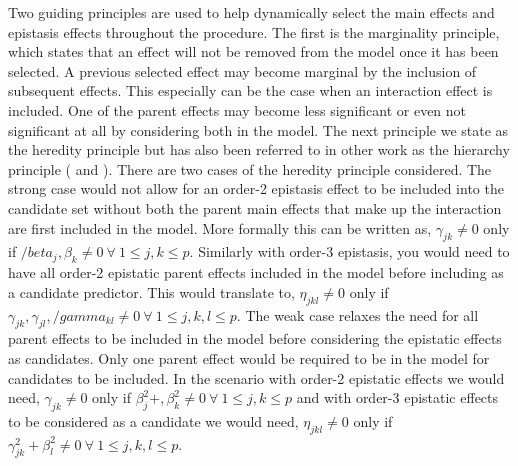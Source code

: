\documentclass[11pt,]{book}
\theoremstyle{definition}
\theoremstyle{definition}
\theoremstyle{remark}
\begin{document}
Two guiding principles are used to help dynamically select the main
effects and epistasis effects throughout the procedure. The first is the
marginality principle, which states that an effect will not be removed
from the model once it has been selected. A previous selected effect may
become marginal by the inclusion of subsequent effects. This especially
can be the case when an interaction effect is included. One of the
parent effects may become less significant or even not significant at
all by considering both in the model. The next principle we state as the
heredity principle but has also been referred to in other work as the
hierarchy principle (\cite{bien2013lasso} and \cite{lim2015learning}).
There are two cases of the heredity principle considered. The strong
case would not allow for an order-2 epistasis effect to be included into
the candidate set without both the parent main effects that make up the
interaction are first included in the model. More formally this can be
written as, \(\gamma_{jk} \ne 0\) only if
\(/beta_j ,\beta_k \ne 0 ~\forall~ 1 \le j, k \le p\). Similarly with
order-3 epistasis, you would need to have all order-2 epistatic parent
effects included in the model before including as a candidate predictor.
This would translate to, \(\eta_{jkl} \ne 0\) only if
\(\gamma_{jk},\gamma_{jl},/gamma_{kl} \ne 0~\forall~ 1 \le j,k,l \le p\).
The weak case relaxes the need for all parent effects to be included in
the model before considering the epistatic effects as candidates. Only
one parent effect would be required to be in the model for candidates to
be included. In the scenario with order-2 epistatic effects we would
need, \(\gamma_{jk} \ne 0\) only if
\(\beta_j^2+,\beta_k^2 \ne 0~ \forall~ 1 \le j, k \le p\) and with
order-3 epistatic effects to be considered as a candidate we would need,
\(\eta_{jkl} \ne 0\) only if
\(\gamma_{jk}^2+\beta_l^2 \ne 0~\forall~ 1 \le j, k, l \le p\).
\end{document}

